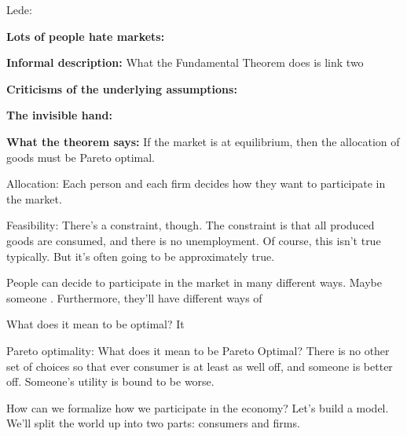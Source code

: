 


Lede:

\textbf{Lots of people hate markets:}

\textbf{Informal description:} What the Fundamental Theorem does is
link two

\textbf{Criticisms of the underlying assumptions:}

\textbf{The invisible hand:}

\textbf{What the theorem says:} If the market is at equilibrium, then
the allocation of goods must be Pareto optimal.

Allocation: Each person and each firm decides how they want to
participate in the market.

Feasibility: There's a constraint, though.  The constraint is that all
produced goods are consumed, and there is no unemployment.  Of course,
this isn't true typically.  But it's often going to be approximately
true.


People can decide to participate in the market in many different ways.
Maybe someone .  Furthermore, they'll have different ways of

What does it mean to be optimal?  It 

Pareto optimality: What does it mean to be Pareto Optimal?  There is
no other set of choices so that ever consumer is at least as well off,
and someone is better off.  Someone's utility is bound to be worse.



How can we formalize how we participate in the economy?  Let's build a
model.  We'll split the world up into two parts: consumers and firms.



